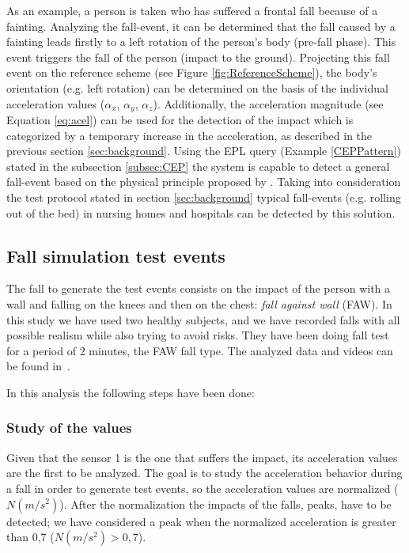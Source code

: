\documentclass[review]{elsarticle}
\begin{document}
As an example, a person is taken who has suffered a frontal fall because of a fainting. Analyzing the fall-event, it can be determined that the fall caused by a fainting leads firstly to a left rotation of the person's body (pre-fall phase). This event triggers the fall of the person (impact to the ground). Projecting this fall event on the reference scheme (see Figure \ref{fig:ReferenceScheme}), the body's orientation (e.g. left rotation) can be determined on the basis of the individual acceleration values ($\alpha_x$,  $\alpha_y$,  $\alpha_z$). Additionally, the acceleration magnitude (see Equation \ref{eq:acel}) can be used for the detection of the impact which is categorized by a temporary increase in the acceleration, as described in the previous section \ref{sec:background}. Using the EPL query (Example \ref{CEPPattern}) stated in the subsection \ref{subsec:CEP} the system is capable to detect a general fall-event based on the physical principle proposed by \cite{Kozina}.
Taking into consideration the test protocol stated in section \ref{sec:background} typical fall-events (e.g. rolling out of the bed) in nursing homes and hospitals can be detected by this solution.

\subsection{Fall simulation test events}

The fall to generate the test events consists on the impact of the person with 
a wall and falling on the knees and then on the chest: \textit{fall against wall} (FAW). 
In this study we have used two healthy subjects, and we have recorded falls with all 
possible realism while also trying to avoid risks. They have been doing fall test for a period 
of 2 minutes, the FAW fall type. The analyzed data and videos can be found in~\cite{FallRepo}.

In this analysis the following steps have been done:

\subsubsection*{Study of the values} Given that the sensor 1 is the one that suffers the 
impact, its acceleration values are the first to be analyzed. The goal is to study 
the acceleration behavior during a fall in order to generate test events, so the acceleration 
values are normalized ($N(m/s^2)$). After the normalization the impacts of the falls, peaks, 
have to be detected; we have considered a peak when the normalized acceleration is 
greater than 0,7 ($N(m/s^2) > 0,7$). 
\end{document}
